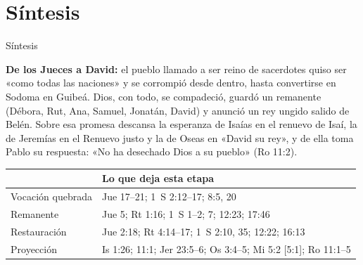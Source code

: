 \AtBeginSection[]{}
\section{Síntesis}
\begin{frame}{Síntesis}
\begin{tcolorbox}[colback=piedra,colframe=ladrillo,boxrule=1pt,arc=3pt,fontupper=\small]
\textbf{\textcolor{cafe}{De los Jueces a David:}} el pueblo llamado a ser reino de sacerdotes quiso ser «como todas las naciones» y se corrompió desde dentro, hasta convertirse en Sodoma en Guibeá. Dios, con todo, se compadeció, guardó un remanente (Débora, Rut, Ana, Samuel, Jonatán, David) y anunció un rey ungido salido de Belén. Sobre esa promesa descansa la esperanza de Isaías en el renuevo de Isaí, la de Jeremías en el Renuevo justo y la de Oseas en «David su rey», y de ella toma Pablo su respuesta: «No ha desechado Dios a su pueblo» (Ro 11:2).
\end{tcolorbox}
\scriptsize\renewcommand{\arraystretch}{1.25}
\begin{tabular}{>{\RaggedRight\arraybackslash}p{3.0cm}>{\RaggedRight\arraybackslash}p{8.6cm}}
\toprule
{\color{ladrillo}\bfseries Eje} & {\color{ladrillo}\bfseries Lo que deja esta etapa}\\\midrule
Vocación quebrada & Jue 17--21; 1~S 2:12--17; 8:5, 20\\
Remanente & Jue 5; Rt 1:16; 1~S 1--2; 7; 12:23; 17:46\\
Restauración & Jue 2:18; Rt 4:14--17; 1~S 2:10, 35; 12:22; 16:13\\
Proyección & Is 1:26; 11:1; Jer 23:5--6; Os 3:4--5; Mi 5:2 [5:1]; Ro 11:1--5\\
\bottomrule
\end{tabular}
\elabpropia
\end{frame}


